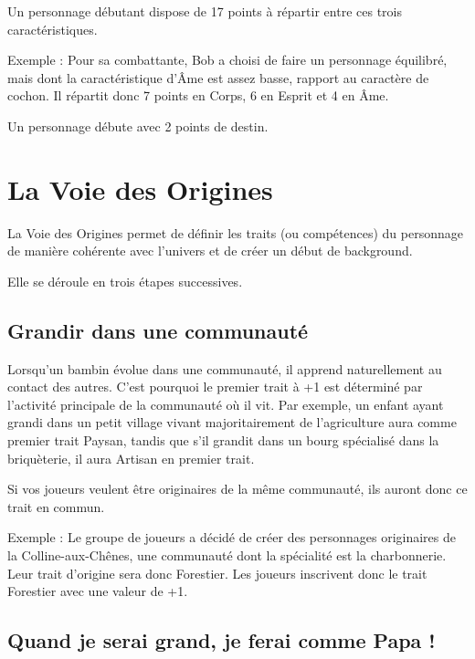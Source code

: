 \documentclass[a4paper,10pt,twoside,twocolumn,openany,bg=print]{dndbook}
\begin{document}
Un personnage débutant dispose de 17 points à répartir entre ces trois caractéristiques.

\begin{quotebox}
Exemple : Pour sa combattante, Bob a choisi de faire un personnage équilibré, mais dont la caractéristique d'Âme est assez basse, rapport au caractère de cochon. Il répartit donc 7 points en Corps, 6 en Esprit et 4 en Âme.
\end{quotebox}

Un personnage débute avec 2 points de destin.

\section{La Voie des Origines}

La Voie des Origines permet de définir les traits (ou compétences) du personnage de manière cohérente avec l'univers et de créer un début de background.

Elle se déroule en trois étapes successives.

\subsection*{Grandir dans une communauté}

Lorsqu'un bambin évolue dans une communauté, il apprend naturellement au contact des autres. C'est pourquoi le premier trait à +1 est déterminé par l'activité principale de la communauté où il vit. Par exemple, un enfant ayant grandi dans un petit village vivant majoritairement de l'agriculture aura comme premier trait Paysan, tandis que s'il grandit dans un bourg spécialisé dans la briquèterie, il aura Artisan en premier trait.

Si vos joueurs veulent être originaires de la même communauté, ils auront donc ce trait en commun.

\begin{quotebox}
Exemple : Le groupe de joueurs a décidé de créer des personnages originaires de la Colline-aux-Chênes, une communauté dont la spécialité est la charbonnerie. Leur trait d'origine sera donc Forestier. Les joueurs inscrivent donc le trait Forestier avec une valeur de +1.
\end{quotebox}

\subsection*{Quand je serai grand, je ferai comme Papa !}
\end{document}
